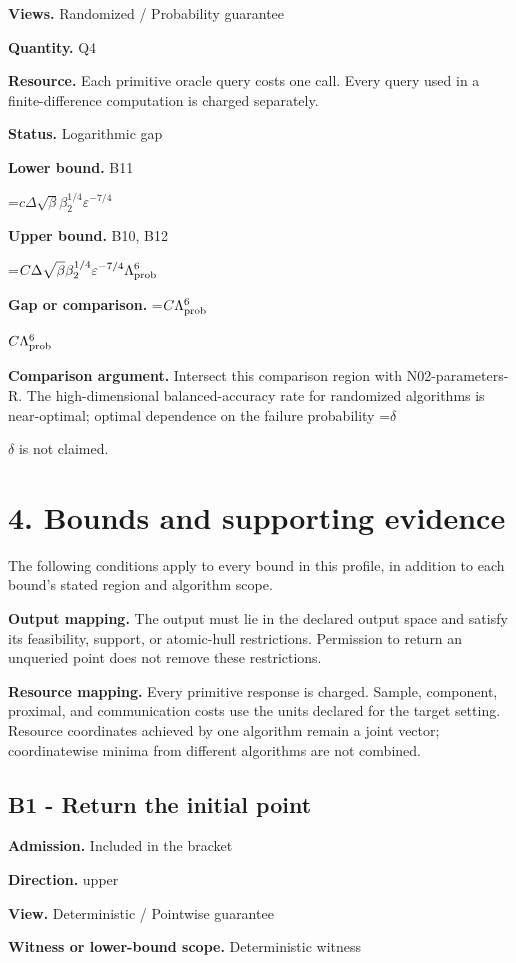 \documentclass[10pt,a4paper]{article}
\newcommand{\AtlasMath}[1]{\par\begingroup\centering\setbox0=\hbox{$\displaystyle #1$}\ifdim\wd0>1.4\linewidth\typeout{ATLAS WIDE FORMULA: \the\wd0}\fi\ifdim\wd0>\linewidth\resizebox{\linewidth}{!}{\box0}\else\box0\fi\par\endgroup}
\newcommand{\AtlasInlineMath}[1]{\begingroup\setbox0=\hbox{$#1$}\ifdim\wd0>.4\linewidth\endgroup\AtlasMath{#1}\else\endgroup$#1$\fi}
\begin{document}
\textbf{Views.} Randomized / Probability guarantee

\textbf{Quantity.} Q4

\textbf{Resource.} Each primitive oracle query costs one call. Every query used in a finite-difference computation is charged separately.

\textbf{Status.} Logarithmic gap

\textbf{Lower bound.} B11

\AtlasMath{c\Delta\sqrt\beta\beta_2^{1/4}\varepsilon^{-7/4}}
\textbf{Upper bound.} B10, B12

\AtlasMath{C\Delta\sqrt\beta\beta_2^{1/4}\varepsilon^{-7/4}\Lambda_{\rm prob}^6}
\textbf{Gap or comparison.} \AtlasInlineMath{C\Lambda_{\rm prob}^6}

\textbf{Comparison argument.} Intersect this comparison region with N02-parameters-R. The high-dimensional balanced-accuracy rate for randomized algorithms is near-optimal; optimal dependence on the failure probability \AtlasInlineMath{\delta} is not claimed.

\section{4. Bounds and supporting evidence}
The following conditions apply to every bound in this profile, in addition to each bound's stated region and algorithm scope.

\textbf{Output mapping.} The output must lie in the declared output space and satisfy its feasibility, support, or atomic-hull restrictions. Permission to return an unqueried point does not remove these restrictions.

\textbf{Resource mapping.} Every primitive response is charged. Sample, component, proximal, and communication costs use the units declared for the target setting. Resource coordinates achieved by one algorithm remain a joint vector; coordinatewise minima from different algorithms are not combined.

\subsection{B1 - Return the initial point}
\textbf{Admission.} Included in the bracket

\textbf{Direction.} upper

\textbf{View.} Deterministic / Pointwise guarantee

\textbf{Witness or lower-bound scope.} Deterministic witness
\end{document}
